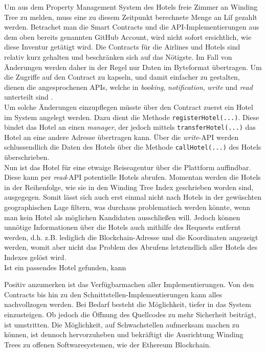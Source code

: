 Um aus dem Property Management System des Hotels freie Zimmer an Winding Tree zu melden, muss eine zu diesem Zeitpunkt berechnete Menge an Líf gezahlt werden. Betrachet man die Smart Contracts und die API-Implementierungen aus dem oben bereits genannten GitHub Account, wird nicht sofort ersichtlich, wie diese Inventur getätigt wird. Die Contracts für die Airlines und Hotels sind relativ kurz gehalten und beschränken sich auf das Nötigste. Im Fall von Änderungen werden daher in der Regel nur Daten im Byteformat übertragen. Um die Zugriffe auf den Contract zu kapseln, und damit einfacher zu gestalten, dienen die angesprochenen APIs, welche in \emph{booking}, \emph{notification}, \emph{write} und \emph{read} unterteilt sind \cite[vgl.][]{WTAPIOverview2019}.\\
Um solche Änderungen einzupflegen müsste über den Contract zuerst ein Hotel im System angelegt werden. Dazu dient die Methode \texttt{registerHotel(...)}. Diese bindet das Hotel an einen \emph{manager}, der jedoch mittels \texttt{transferHotel(...)} das Hotel an eine andere Adresse übertragen kann. Über die \emph{write}-API werden schlussendlich die Daten des Hotels über die Methode \texttt{callHotel(...)} des Hotels überschrieben. \cite[vgl.][]{WTHotelContract2019, WTInventory2019}\\
Nun ist das Hotel für eine etwaige Reiseagentur über die Plattform auffindbar. Diese kann per \emph{read}-API potentielle Hotels abrufen. Momentan werden die Hotels in der Reihenfolge, wie sie in den Winding Tree Index geschrieben worden sind, ausgegegen. Somit lässt sich auch erst einmal nicht nach Hotels in der gewüschten geographischen Lage filtern, was durchaus problematisch werden könnte, wenn man kein Hotel als möglichen Kandidaten ausschließen will. Jedoch können unnötige Informationen über die Hotels auch mithilfe des Requests entfernt werden, d.h. z.B. lediglich die Blockchain-Adresse und die Koordinaten angezeigt werden, womit aber nicht das Problem des Abrufens letztendlich aller Hotels des Indexes gelöst wird. \cite{WTQueryInventory2019}\\
Ist ein passendes Hotel gefunden, kann 

Positiv anzumerken ist das Verfügbarmachen aller Implementierungen. Von den Contracts bis hin zu den Schnittstellen-Implementierungen kann alles nachvollzogen werden. Bei Bedarf besteht die Möglichkeit, tiefer in das System einzusteigen. Ob jedoch die Öffnung des Quellcodes zu mehr Sicherheit beiträgt, ist umstritten. Die Möglichkeit, auf Schwachstellen aufmerksam machen zu können, ist dennoch hervorzuheben und bekräftigt die Ausrichtung Winding Trees zu offenen Softwaresystemen, wie der Ethereum Blockchain. 

